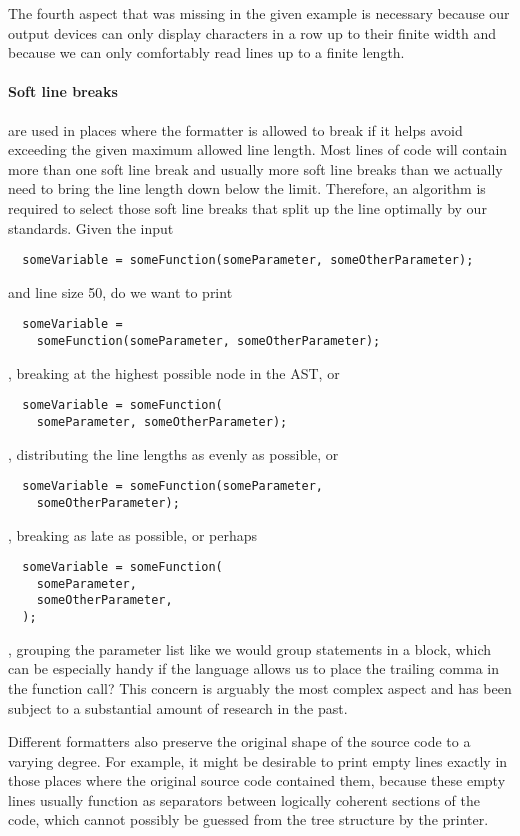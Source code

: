 \bigbreak{}
The fourth aspect that was missing in the given example is necessary
because our output devices can only display characters in a row up to their finite width and
because we can only comfortably read lines up to a finite length.
\paragraph{Soft line breaks} are used in places where the formatter is allowed to break
if it helps avoid exceeding the given maximum allowed line length.
Most lines of code will contain more than one soft line break and usually more soft line breaks
than we actually need to bring the line length down below the limit.
Therefore, an algorithm is required to select those soft line breaks
that split up the line optimally by our standards.
Given the input
\begin{verbatim}
  someVariable = someFunction(someParameter, someOtherParameter);
\end{verbatim}
and line size 50, do we want to print
\begin{verbatim}
  someVariable =
    someFunction(someParameter, someOtherParameter);
\end{verbatim}
, breaking at the highest possible node in the AST, or
\begin{verbatim}
  someVariable = someFunction(
    someParameter, someOtherParameter);
\end{verbatim}
, distributing the line lengths as evenly as possible, or
\begin{verbatim}
  someVariable = someFunction(someParameter,
    someOtherParameter);
\end{verbatim}
, breaking as late as possible, or perhaps
\begin{verbatim}
  someVariable = someFunction(
    someParameter,
    someOtherParameter,
  );
\end{verbatim}
, grouping the parameter list like we would group statements in a block,
which can be especially handy if the language allows us to place the trailing comma in the function call?
This concern is arguably the most complex aspect and has been subject to a substantial amount of research in the past.
\autocite{designPrettyPrintingLib}\autocite{prettierPrinter}

\bigbreak{}
Different formatters also preserve the original shape of the source code to a varying degree.
For example, it might be desirable to print empty lines
exactly in those places where the original source code contained them,
\autocite[Section: Empty lines]{prettierRationale}
because these empty lines usually function as separators between logically coherent sections of the code,
which cannot possibly be guessed from the tree structure by the printer.
